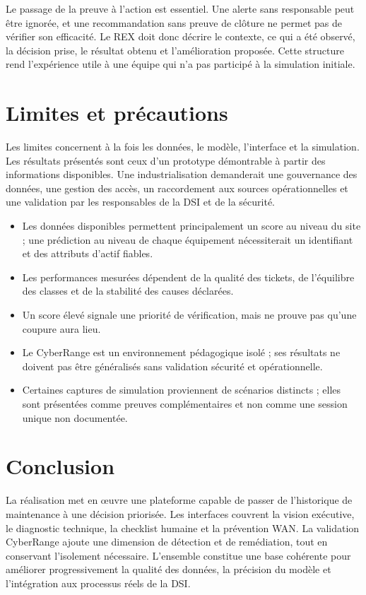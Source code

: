 \documentclass[12pt,a4paper,oneside]{report}
\begin{document}
Le passage de la preuve à l’action est essentiel. Une alerte sans responsable peut être ignorée, et une recommandation sans preuve de clôture ne permet pas de vérifier son efficacité. Le REX doit donc décrire le contexte, ce qui a été observé, la décision prise, le résultat obtenu et l’amélioration proposée. Cette structure rend l’expérience utile à une équipe qui n’a pas participé à la simulation initiale.

\section{Limites et précautions}

Les limites concernent à la fois les données, le modèle, l’interface et la simulation. Les résultats présentés sont ceux d’un prototype démontrable à partir des informations disponibles. Une industrialisation demanderait une gouvernance des données, une gestion des accès, un raccordement aux sources opérationnelles et une validation par les responsables de la DSI et de la sécurité.

\begin{itemize}
  \item Les données disponibles permettent principalement un score au niveau du site ; une prédiction au niveau de chaque équipement nécessiterait un identifiant et des attributs d’actif fiables.
  \item Les performances mesurées dépendent de la qualité des tickets, de l’équilibre des classes et de la stabilité des causes déclarées.
  \item Un score élevé signale une priorité de vérification, mais ne prouve pas qu’une coupure aura lieu.
  \item Le CyberRange est un environnement pédagogique isolé ; ses résultats ne doivent pas être généralisés sans validation sécurité et opérationnelle.
  \item Certaines captures de simulation proviennent de scénarios distincts ; elles sont présentées comme preuves complémentaires et non comme une session unique non documentée.
\end{itemize}

\section{Conclusion}

La réalisation met en œuvre une plateforme capable de passer de l’historique de maintenance à une décision priorisée. Les interfaces couvrent la vision exécutive, le diagnostic technique, la checklist humaine et la prévention WAN. La validation CyberRange ajoute une dimension de détection et de remédiation, tout en conservant l’isolement nécessaire. L’ensemble constitue une base cohérente pour améliorer progressivement la qualité des données, la précision du modèle et l’intégration aux processus réels de la DSI.
\end{document}
